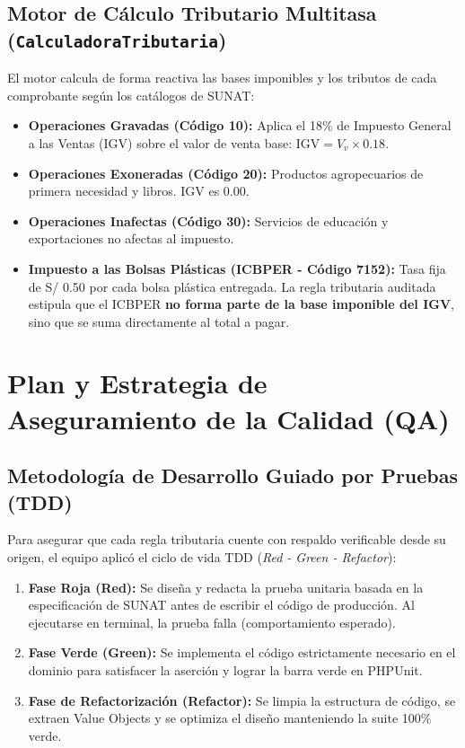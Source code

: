 \documentclass[11pt,a4paper]{article}
\begin{document}
\subsection{Motor de Cálculo Tributario Multitasa (\texttt{CalculadoraTributaria})}
El motor calcula de forma reactiva las bases imponibles y los tributos de cada comprobante según los catálogos de SUNAT:
\begin{itemize}[noitemsep]
    \item \textbf{Operaciones Gravadas (Código 10):} Aplica el 18\% de Impuesto General a las Ventas (IGV) sobre el valor de venta base: $\text{IGV} = V_v \times 0.18$.
    \item \textbf{Operaciones Exoneradas (Código 20):} Productos agropecuarios de primera necesidad y libros. IGV es 0.00.
    \item \textbf{Operaciones Inafectas (Código 30):} Servicios de educación y exportaciones no afectas al impuesto.
    \item \textbf{Impuesto a las Bolsas Plásticas (ICBPER - Código 7152):} Tasa fija de S/ 0.50 por cada bolsa plástica entregada. La regla tributaria auditada estipula que el ICBPER \textbf{no forma parte de la base imponible del IGV}, sino que se suma directamente al total a pagar.
\end{itemize}

\section{Plan y Estrategia de Aseguramiento de la Calidad (QA)}

\subsection{Metodología de Desarrollo Guiado por Pruebas (TDD)}
Para asegurar que cada regla tributaria cuente con respaldo verificable desde su origen, el equipo aplicó el ciclo de vida TDD (\textit{Red - Green - Refactor}):
\begin{enumerate}[noitemsep]
    \item \textbf{Fase Roja (Red):} Se diseña y redacta la prueba unitaria basada en la especificación de SUNAT antes de escribir el código de producción. Al ejecutarse en terminal, la prueba falla (comportamiento esperado).
    \item \textbf{Fase Verde (Green):} Se implementa el código estrictamente necesario en el dominio para satisfacer la aserción y lograr la barra verde en PHPUnit.
    \item \textbf{Fase de Refactorización (Refactor):} Se limpia la estructura de código, se extraen Value Objects y se optimiza el diseño manteniendo la suite 100\% verde.
\end{enumerate}
\end{document}
